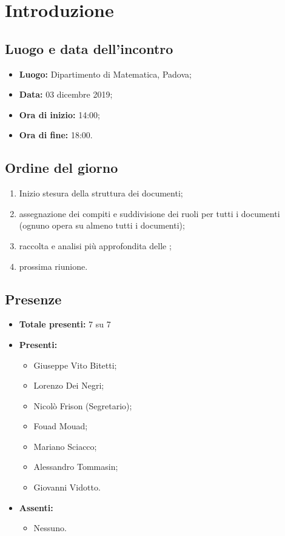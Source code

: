 \section*{Introduzione}

\subsection*{Luogo e data dell'incontro}
	\begin{itemize}
		\item \textbf{Luogo:} Dipartimento di Matematica, Padova;

		\item \textbf{Data:} 03 dicembre 2019;

		\item \textbf{Ora di inizio:} 14:00;
		\item \textbf{Ora di fine:} 18:00.
	\end{itemize}

\subsection*{Ordine del giorno}
	\begin{enumerate}
		\item Inizio stesura della struttura dei documenti;
		\item assegnazione dei compiti e suddivisione dei ruoli per tutti i documenti (ognuno opera su almeno tutti i documenti);
		\item raccolta e analisi più approfondita delle ;
		\item prossima riunione.

	\end{enumerate}

\subsection*{Presenze}
	\begin{itemize}
		\item \textbf{Totale presenti:} 7 su 7
		\item \textbf{Presenti: }

			\begin{itemize}
				\item Giuseppe Vito Bitetti;
				\item Lorenzo Dei Negri;
				\item Nicolò Frison (Segretario);
				\item Fouad Mouad;
				\item Mariano Sciacco;
				\item Alessandro Tommasin;
				\item Giovanni Vidotto.
			\end{itemize}
		\item \textbf{Assenti: }
    \begin{itemize}
			\item Nessuno.
		\end{itemize}

	\end{itemize}


